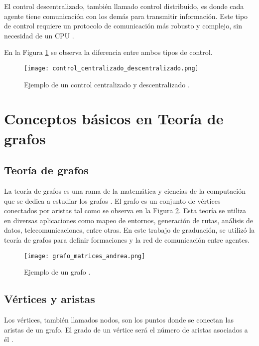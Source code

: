 El control descentralizado, también llamado control distribuido, es donde cada agente tiene comunicación con los demás para transmitir información. Este tipo de control requiere un protocolo de comunicación más robusto y complejo, sin necesidad de un CPU \cite{Control_centralizado_descentralizado}.

En la Figura \ref{fig:control_centralizado_descentralizado} se observa la diferencia entre ambos tipos de control.

\begin{figure}[H]
	\centering
	\texttt{[image: control\_centralizado\_descentralizado.png]}
	\caption{Ejemplo de un control centralizado y descentralizado \cite{Control_centralizado_descentralizado}.}
	\label{fig:control_centralizado_descentralizado}
\end{figure}


\section{Conceptos básicos en Teoría de grafos}

\subsection{Teoría de grafos}
La teoría de grafos es una rama de la matemática y ciencias de la computación que se dedica a estudiar los grafos \cite{teoria_de_grafos}. El grafo es un conjunto de vértices conectados por aristas tal como se observa en la Figura \ref{fig:teoria_de_grafos}. Esta teoría se utiliza en diversas aplicaciones como mapeo de entornos, generación de rutas, análisis de datos, telecomunicaciones, entre otras. En este trabajo de graduación, se utilizó la teoría de grafos para definir formaciones y la red de comunicación entre agentes.

\begin{figure}[H]
	\centering
	\texttt{[image: grafo\_matrices\_andrea.png]}
	\caption{Ejemplo de un grafo \cite{PenaAM_2019_tesis}.}
	\label{fig:teoria_de_grafos}
\end{figure}

\subsection{Vértices y aristas}
Los vértices, también llamados nodos, son los puntos donde se conectan las aristas de un grafo. El grado de un vértice será el número de aristas asociados a él \cite{teoria_de_grafos}. 

